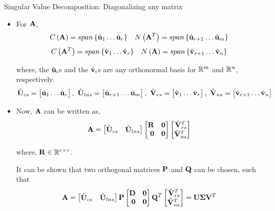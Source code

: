 \documentclass[aspectratio=169]{beamer}
\def\mf{\ensuremath\mathbf}
\def\mb{\ensuremath\mathbb}
\def\lp{\ensuremath\left(}
\def\rp{\ensuremath\right)}
\def\lc{\ensuremath\left\{}
\def\rc{\ensuremath\right\}}
\def\bmx{\ensuremath\begin{bmatrix*}[r]}
\def\emx{\ensuremath\end{bmatrix*}}
\begin{document}
\begin{frame}[t]{Singular Value Decomposition: Diagonalizing any matrix}
\begin{itemize}
    \item For $\mf{A}$,
    \vspace{-0.5cm}
    \[ C\lp\mf{A}\rp = span\lc\hat{\mf{u}}_{1} \ldots \hat{\mf{u}}_{r}\rc\,\,\,\,\, N\lp\mf{A}^T\rp =  span\lc\hat{\mf{u}}_{r+1} \ldots \hat{\mf{u}}_{m}\rc \]\vspace{-0.8cm}
    \[ C\lp\mf{A}^T\rp = span\lc\hat{\mf{v}}_{1} \ldots \hat{\mf{v}}_{r}\rc\,\,\,\,\, N\lp\mf{A}\rp = span\lc\hat{\mf{v}}_{r+1} \ldots \hat{\mf{v}}_{n}\rc \]\vspace{-0.2cm}

    where, the $\hat{\mf{u}}_i$s and the $\hat{\mf{v}}_i$s are any orthonormal basis for $\mb{R}^m$ and $\mb{R}^n$, respectively.
    \vspace{-0.2cm}
    {\small $$\hat{\mf{U}}_{cs} = \bmx\hat{\mf{u}}_{1} \ldots \hat{\mf{u}}_{r}\emx,\,\, \hat{\mf{U}}_{lns} = \bmx\hat{\mf{u}}_{r+1} \ldots \hat{\mf{u}}_{m}\emx,\,\, \hat{\mf{V}}_{rs} = \bmx\hat{\mf{v}}_{1} \ldots \hat{\mf{v}}_{r}\emx,\,\, \hat{\mf{V}}_{ns} = \bmx\hat{\mf{v}}_{r+1} \ldots \hat{\mf{v}}_{n}\emx$$}
    \vspace{-0.5cm}

    \item Now, $\mf{A}$ can be written as,
    \vspace{-0.3cm}
    \[ \mf{A} = \bmx\hat{\mf{U}}_{cs} & \hat{\mf{U}}_{lns}\emx \bmx \mf{R} & \mf{0}\\ \mf{0} & \mf{0} \emx \bmx\hat{\mf{V}}_{rs}^T \\ \hat{\mf{V}}_{ns}^T\emx \]\vspace{-0.4cm}

    where, $\mf{R} \in \mb{R}^{r \times r}$.

    It can be shown that two orthogonal matrices $\mf{P}$ and $\mf{Q}$ can be chosen, such that
    \[ \mf{A} = \bmx\hat{\mf{U}}_{cs} & \hat{\mf{U}}_{lns}\emx \mf{P} \bmx \mf{D} & \mf{0}\\ \mf{0} & \mf{0} \emx \mf{Q}^T \bmx\hat{\mf{V}}_{rs}^T \\ \hat{\mf{V}}_{ns}^T\emx = \mf{U}\mf{\Sigma}\mf{V}^T \]
\end{itemize}
\end{frame}
\end{document}
